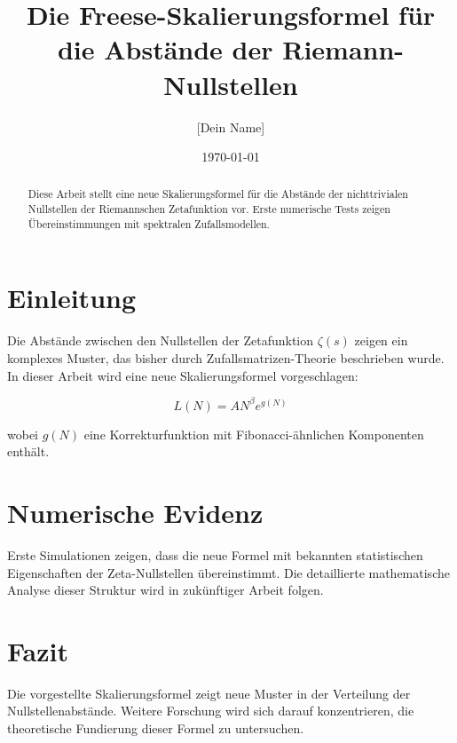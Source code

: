 \documentclass[a4paper,12pt]{article}
\title{Die Freese-Skalierungsformel für die Abstände der Riemann-Nullstellen}
\author{[Dein Name]}
\date{\today}
\begin{document}
\maketitle

\begin{abstract}
Diese Arbeit stellt eine neue Skalierungsformel für die Abstände der nichttrivialen Nullstellen der Riemannschen Zetafunktion vor. Erste numerische Tests zeigen Übereinstimmungen mit spektralen Zufallsmodellen.
\end{abstract}

\section{Einleitung}
Die Abstände zwischen den Nullstellen der Zetafunktion $\zeta(s)$ zeigen ein komplexes Muster, das bisher durch Zufallsmatrizen-Theorie beschrieben wurde.  
In dieser Arbeit wird eine neue Skalierungsformel vorgeschlagen:

\[
L(N) = A N^{\beta} e^{g(N)}
\]

wobei $g(N)$ eine Korrekturfunktion mit Fibonacci-ähnlichen Komponenten enthält.

\section{Numerische Evidenz}
Erste Simulationen zeigen, dass die neue Formel mit bekannten statistischen Eigenschaften der Zeta-Nullstellen übereinstimmt.  
Die detaillierte mathematische Analyse dieser Struktur wird in zukünftiger Arbeit folgen.

\section{Fazit}
Die vorgestellte Skalierungsformel zeigt neue Muster in der Verteilung der Nullstellenabstände.  
Weitere Forschung wird sich darauf konzentrieren, die theoretische Fundierung dieser Formel zu untersuchen.
\end{document}
